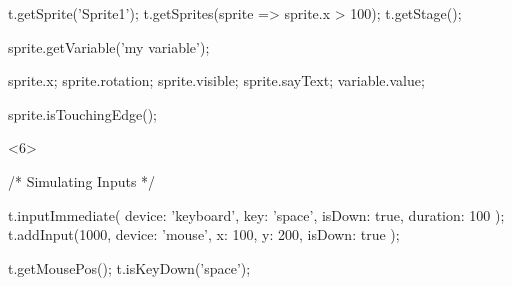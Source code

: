 \begin{frame}[fragile]
\begin{onlyenv}
\begin{minipage}{.6\textwidth}
\begin{javascriptcode}
                t.getSprite('Sprite1');
                t.getSprites(sprite => sprite.x > 100);
                t.getStage();

                sprite.getVariable('my variable');

                sprite.x;
                sprite.rotation;
                sprite.visible;
                sprite.sayText;
                variable.value;

                sprite.isTouchingEdge();
            \end{javascriptcode}
        \end{minipage}
    \end{onlyenv}
    \begin{onlyenv}<6>
        \begin{minipage}{.6\textwidth}
            \begin{javascriptcode}
                /* Simulating Inputs */

                t.inputImmediate({
                    device: 'keyboard',
                    key: 'space',
                    isDown: true,
                    duration: 100
                });
                t.addInput(1000, {
                    device: 'mouse',
                    x: 100,
                    y: 200,
                    isDown: true
                });

                t.getMousePos();
                t.isKeyDown('space');
            \end{javascriptcode}
        \end{minipage}
    \end{onlyenv}
\end{frame}

%
%
%
%

